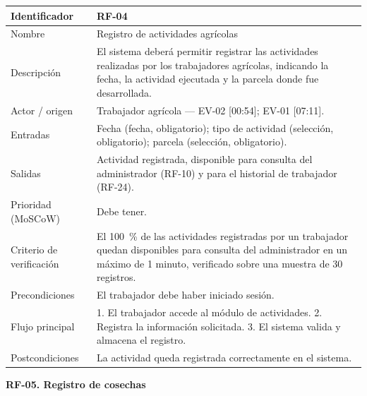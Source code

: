 \documentclass[12pt,a4paper]{article}
\begin{document}
\begin{center}
\begin{longtable}{|p{3.5cm}|p{10.7cm}|}
\hline
Identificador & RF-04 \\
\hline
Nombre & Registro de actividades agrícolas \\
\hline
Descripción & El sistema deberá permitir registrar las actividades realizadas por los trabajadores agrícolas, indicando la fecha, la actividad ejecutada y la parcela donde fue desarrollada. \\
\hline
Actor / origen & Trabajador agrícola --- EV-02 [00:54]; EV-01 [07:11]. \\
\hline
Entradas & Fecha (fecha, obligatorio); tipo de actividad (selección, obligatorio); parcela (selección, obligatorio). \\
\hline
Salidas & Actividad registrada, disponible para consulta del administrador (RF-10) y para el historial de trabajador (RF-24). \\
\hline
Prioridad (MoSCoW) & Debe tener. \\
\hline
Criterio de verificación & El 100~\% de las actividades registradas por un trabajador quedan disponibles para consulta del administrador en un máximo de 1 minuto, verificado sobre una muestra de 30 registros. \\
\hline
Precondiciones & El trabajador debe haber iniciado sesión. \\
\hline
Flujo principal & 1. El trabajador accede al módulo de actividades. 2. Registra la información solicitada. 3. El sistema valida y almacena el registro. \\
\hline
Postcondiciones & La actividad queda registrada correctamente en el sistema. \\
\hline
\end{longtable}
\end{center}

\bigskip
\noindent\textbf{RF-05. Registro de cosechas}
\label{tab:RF-05}
\end{document}
